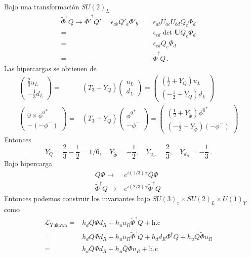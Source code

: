 Bajo una transformaci\'on $SU(2)_L$
\begin{align}
\widetilde{\Phi}^\dagger Q\to {\widetilde{\Phi'}}^\dagger Q'=\epsilon_{ab}Q'_a \Phi'_b=&\epsilon_{ab}U_{ac}U_{bd}Q_c \Phi_d\nonumber\\
  =&\epsilon_{cd}\det\mathbf{U} Q_c \Phi_d\nonumber\\
  =&\epsilon_{cd} Q_c \Phi_d\nonumber\\
  =&\widetilde{\Phi}^\dagger Q\,.
\end{align}
Las hipercargas se obtienen de
\begin{align}
  \begin{pmatrix}
    \frac{2}{3}u_L\\
    -\frac{1}{3}d_L
  \end{pmatrix}=&
  (T_3+Y_Q)
  \begin{pmatrix}
    u_L\\
    d_L
  \end{pmatrix}=
  \begin{pmatrix}
    (\frac{1}{2}+Y_Q)u_L\\
    (-\frac{1}{2}+Y_Q)d_L
  \end{pmatrix}\nonumber\\
  \begin{pmatrix}
    0\times{\phi^0}^*\\
    -(-\phi^-)
  \end{pmatrix}=&
  (T_3+Y_Q)
  \begin{pmatrix}
    {\phi^0}^*\\
    -\phi^-
  \end{pmatrix}=
  \begin{pmatrix}
    (\frac{1}{2}+Y_{\widetilde{\Phi}}){\phi^0}^*\\
    (-\frac{1}{2}+Y_{\widetilde{\Phi}})(-\phi^-)
  \end{pmatrix}
\end{align}
Entonces
\begin{equation}
  Y_Q=\frac{2}{3}-\frac{1}{2}=1/6,\quad Y_{\widetilde{\Phi}}=-\frac{1}{2},\quad Y_{u_R}=\frac{2}{3}
,\quad Y_{d_R}=-\frac{1}{3}\,.
\end{equation}
Bajo hipercarga
\begin{align}
\overline{Q}\Phi\to&e^{i(1/3)\alpha}\overline{Q}\Phi\nonumber\\
\widetilde{\Phi}^\dagger Q\to&e^{i(2/3)\alpha}\widetilde{\Phi}^\dagger Q\,
\end{align}
Entonces podemos construir los invariantes bajo $SU(3)_c\times SU(2)_L\times U(1)_Y$ como
\begin{align}
  \mathcal{L}_{\text{Yukawa}}=&h_d\overline{Q}\Phi d_R+h_u\overline{u_R}\widetilde{\Phi}^\dagger Q+\text{h.c}\nonumber\\
  =&h_d\overline{Q}\Phi d_R+h_u\overline{u_R}\widetilde{\Phi}^\dagger Q+h_d\overline{d_R}\Phi^\dagger Q+h_u\overline{Q}\widetilde{\Phi}u_R\nonumber\\
=&h_d\overline{Q}\Phi d_R+h_u\overline{Q}\widetilde{\Phi}u_R+\text{h.c}\,
\end{align}
